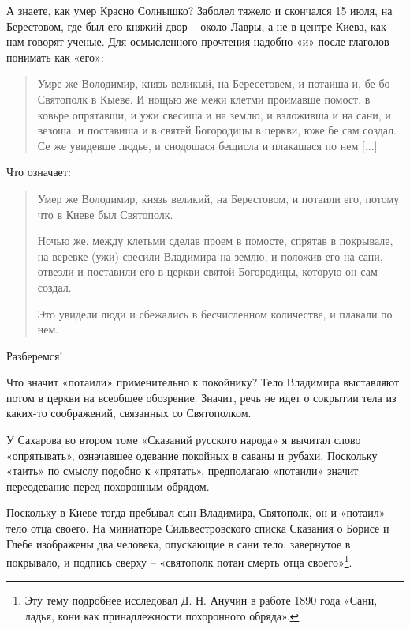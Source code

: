 А знаете, как умер Красно Солнышко? Заболел тяжело и скончался 15 июля, на Берестовом, где был его княжий двор – около Лавры, а не в центре Киева, как нам говорят ученые. Для осмысленного прочтения надобно «и» после глаголов понимать как «его»:

\begin{quotation}
Умре же Володимир, князь великый, на Бересетовем, и потаиша и, бе бо Святополк в Кыеве. И нощью же межи клетми проимавше помост, в ковьре опрятавши, и ужи свесиша и на землю, и взложивша и на сани, и везоша, и поставиша и в святей Богородицы в церкви, юже бе сам создал. Се же увидевше людье, и снодошася бещисла и плакашася по нем [...]
\end{quotation}

Что означает:

\begin{quotation}
Умер же Володимир, князь великий, на Берестовом, и потаили его, потому что в Киеве был Святополк. 

Ночью же, между клетьми сделав проем в помосте, спрятав в покрывале, на веревке (ужи) свесили Владимира на землю, и положив его на сани, отвезли и поставили его в церкви святой Богородицы, которую он сам создал.

Это увидели люди и сбежались в бесчисленном количестве, и плакали по нем.
\end{quotation}

Разберемся!

Что значит «потаили» применительно к покойнику? Тело Владимира выставляют потом в церкви на всеобщее обозрение. Значит, речь не идет о сокрытии тела из каких-то соображений, связанных со Святополком.

У Сахарова во втором томе «Сказаний русского народа» я вычитал слово «опрятывать», означавшее одевание покойных в саваны и рубахи. Поскольку «таить» по смыслу подобно к «прятать», предполагаю «потаили» значит переодевание перед похоронным обрядом.


Поскольку в Киеве тогда пребывал сын Владимира, Святополк, он и «потаил» тело отца своего. На миниатюре Сильвестровского списка Сказания о Борисе и Глебе изображены два человека, опускающие в сани тело, завернутое в покрывало, и подпись сверху – «святополк потаи смерть отца своего»\footnote{Эту тему подробнее исследовал Д. Н. Анучин в работе 1890 года «Сани, ладья, кони как принадлежности похоронного обряда».}. 

